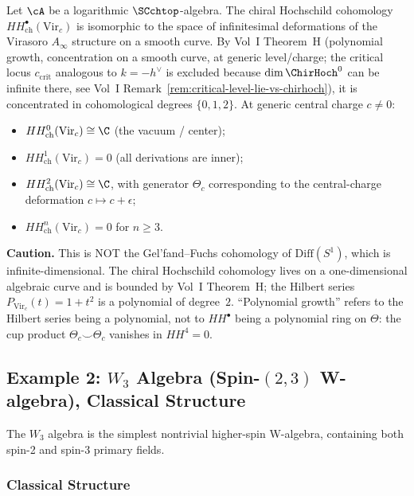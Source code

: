 \begin{proposition}
Let\/ $\cA$ be a logarithmic\/ $\SCchtop$-algebra.
The chiral Hochschild cohomology $HH^\bullet_{\text{ch}}(\text{Vir}_c)$ is isomorphic
to the space of infinitesimal deformations of the Virasoro $A_\infty$ structure on a
smooth curve. By Vol~I Theorem~H (polynomial growth, concentration on a smooth curve,
at generic level/charge; the critical locus $c_{\mathrm{crit}}$ analogous to $k = -h^\vee$
is excluded because $\dim \ChirHoch^0$ can be infinite there, see Vol~I
Remark~\ref*{rem:critical-level-lie-vs-chirhoch}),
it is concentrated in cohomological degrees $\{0,1,2\}$. At generic central charge $c \neq 0$:
\begin{itemize}
\item $HH^0_{\text{ch}}(\text{Vir}_c) \cong \C$ (the vacuum / center);
\item $HH^1_{\text{ch}}(\text{Vir}_c) = 0$ (all derivations are inner);
\item $HH^2_{\text{ch}}(\text{Vir}_c) \cong \C$, with generator $\Theta_c$ corresponding
 to the central-charge deformation $c \mapsto c + \epsilon$;
\item $HH^n_{\text{ch}}(\text{Vir}_c) = 0$ for $n \geq 3$.
\end{itemize}
\textbf{Caution.} This is NOT the Gel'fand--Fuchs cohomology of $\mathrm{Diff}(S^1)$,
which is infinite-dimensional. The chiral Hochschild cohomology lives on a one-dimensional
algebraic curve and is bounded by Vol~I Theorem~H; the Hilbert series
$P_{\text{Vir}_c}(t) = 1 + t^2$ is a polynomial of degree~$2$. ``Polynomial growth''
refers to the Hilbert series being a polynomial, not to $HH^\bullet$ being a polynomial
ring on $\Theta$: the cup product $\Theta_c \smile \Theta_c$ vanishes in $HH^4 = 0$.
\end{proposition}

\subsection{Example 2: $W_3$ Algebra (Spin-$(2,3)$ W-algebra), Classical Structure}

The $W_3$ algebra is the simplest nontrivial higher-spin W-algebra, containing both spin-2 and spin-3 primary fields.

\subsubsection{Classical Structure}

